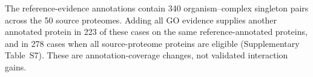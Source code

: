 The reference-evidence annotations contain 340 organism--complex singleton pairs across the 50 source proteomes. Adding all GO evidence supplies another annotated protein in 223 of these cases on the same reference-annotated proteins, and in 278 cases when all source-proteome proteins are eligible (Supplementary Table~S7). These are annotation-coverage changes, not validated interaction gains.
